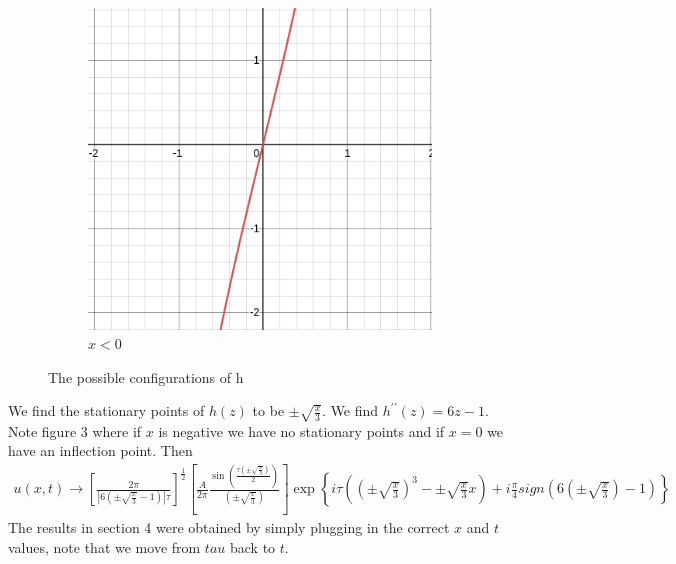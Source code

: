 \documentclass{article}
\begin{document}
\begin{figure}[H]
\begin{subfigure}[b]{40mm}
\includegraphics[scale=0.2]{figures/hN.png}
\caption{$x < 0$}
\label{fig:}
\end{subfigure}

\caption{The possible configurations of h}
\label{fig:}
\end{figure}
We find the stationary points of $h(z)$ to be $\pm\sqrt{\frac{x}{3}}$. We find $h^{\prime\prime}(z) = 6z -1$. Note figure 3 where if $x$ is negative we have no stationary points and if $x=0$ we have an inflection point. Then 
\begin{align*}
u(x,t)\rightarrow \left[\frac{2\pi}{|6(\pm \sqrt{\frac{x}{3}} - 1)| \tau} \right]^{\frac{1}{2}} \left[ \frac{A}{2\pi} \frac{\sin\left( \frac{\tau \left(\pm \sqrt{\frac{x}{3}}\right)}{2} \right)}{\left(\pm\sqrt{\frac{x}{3}}\right)} \right ] \exp\left\{i\tau\left(\left(\pm\sqrt{\frac{x}{3}}\right)^3 - \pm\sqrt{\frac{x}{3}}x \right)+ i\frac{\pi}{4}sign\left(6\left(\pm\sqrt{\frac{x}{3}}\right)-1\right)\right\}
\end{align*}
The results in section 4 were obtained by simply plugging in the correct $x$ and $t$ values, note that we move from $tau$ back to $t$.
\end{document}
